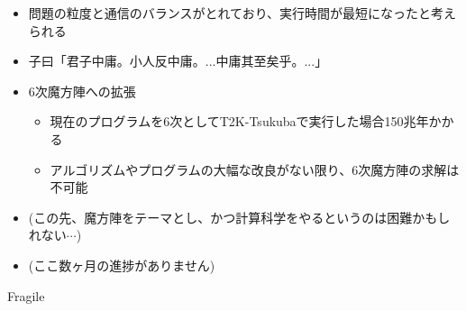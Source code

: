 \documentclass[a4paper,landscape,25pt]{foils}
\begin{document}
\begin{itemize}
\item 問題の粒度と通信のバランスがとれており、実行時間が最短になったと考えられる
\item 子曰「君子中庸。小人反中庸。...中庸其至矣乎。...」
\end{itemize}

\begin{itemize}
\item 6次魔方陣への拡張
\begin{itemize}
\item 現在のプログラムを6次としてT2K-Tsukubaで実行した場合150兆年かかる
\item アルゴリズムやプログラムの大幅な改良がない限り、6次魔方陣の求解は不可能
\end{itemize}
\item (この先、魔方陣をテーマとし、かつ計算科学をやるというのは困難かもしれない$\cdots$)
\item (ここ数ヶ月の進捗がありません)
\end{itemize}

Fragile
\end{document}
